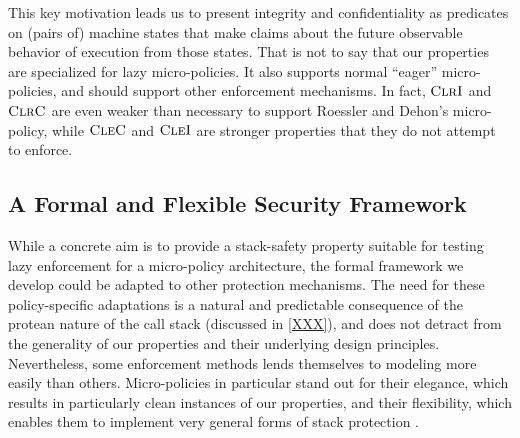 This key motivation leads us to present integrity and confidentiality as predicates on (pairs of)
machine states that make claims about the future observable behavior of execution from those states.
That is not to say that our properties are specialized for lazy micro-policies. It also supports
normal ``eager'' micro-policies, and should support other enforcement mechanisms. In fact, \(\textnormal{\sc ClrI}\)
and \(\textnormal{\sc ClrC}\) are even weaker than necessary to support Roessler and Dehon's micro-policy,
while \(\textnormal{\sc CleC}\) and \(\textnormal{\sc CleI}\) are stronger properties that they do not attempt to enforce.
%
%



\subsection{A Formal and Flexible Security Framework}

While a concrete aim is to provide a stack-safety property suitable for testing
lazy enforcement for a micro-policy architecture, the formal framework we
develop could be adapted to other protection mechanisms.
%
The need for these policy-specific adaptations is a natural and predictable
consequence of the protean nature of the call stack (discussed in \cref{XXX}),
and does not detract from the generality of our properties and their
underlying  design principles.
%
Nevertheless, some enforcement methods lends themselves to modeling more easily
than others. Micro-policies in particular stand out for their elegance, which
results in particularly clean instances of our properties, and their
flexibility, which enables them to implement very general forms of stack
protection .

